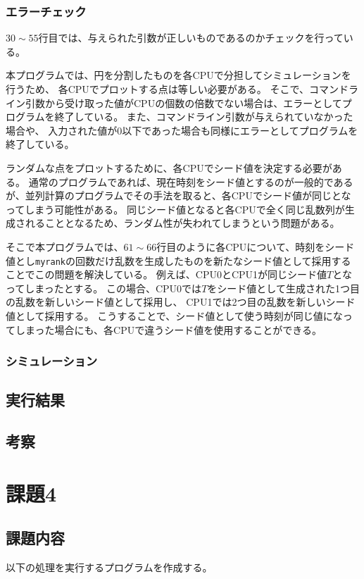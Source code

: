 \documentclass[a4j,titlepage]{jsarticle}
\begin{document}
\subsubsection{エラーチェック}
$30 \sim 55$行目では、与えられた引数が正しいものであるのかチェックを行っている。

本プログラムでは、円を分割したものを各CPUで分担してシミュレーションを行うため、
各CPUでプロットする点は等しい必要がある。
そこで、コマンドライン引数から受け取った値がCPUの個数の倍数でない場合は、エラーとしてプログラムを終了している。
また、コマンドライン引数が与えられていなかった場合や、
入力された値が0以下であった場合も同様にエラーとしてプログラムを終了している。

ランダムな点をプロットするために、各CPUでシード値を決定する必要がある。
通常のプログラムであれば、現在時刻をシード値とするのが一般的であるが、並列計算のプログラムでその手法を取ると、各CPUでシード値が同じとなってしまう可能性がある。
同じシード値となると各CPUで全く同じ乱数列が生成されることとなるため、ランダム性が失われてしまうという問題がある。

そこで本プログラムでは、$61 \sim 66$行目のように各CPUについて、時刻をシード値とし\texttt{myrank}の回数だけ乱数を生成したものを新たなシード値として採用することでこの問題を解決している。
例えば、CPU0とCPU1が同じシード値$T$となってしまったとする。
この場合、CPU0では$T$をシード値として生成された1つ目の乱数を新しいシード値として採用し、
CPU1では2つ目の乱数を新しいシード値として採用する。
こうすることで、シード値として使う時刻が同じ値になってしまった場合にも、各CPUで違うシード値を使用することができる。

\subsubsection{シミュレーション}

\subsection{実行結果}

\subsection{考察}


\section{課題4}
\subsection{課題内容}
以下の処理を実行するプログラムを作成する。
\end{document}
